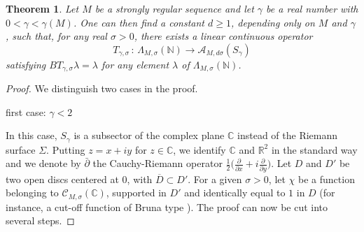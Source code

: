 \documentclass[a4paper]{amsart}
\theoremstyle{plain}
\newtheorem{thm}[subsubsection]{Theorem}
\theoremstyle{definition}
\theoremstyle{remark}
\begin{document}
\begin{thm}\label{mythm}
Let $ M $ be a strongly regular sequence and let $ \gamma $ be a real number with
$ 0<\gamma<\gamma(M) $. One can then find a constant
$ d\geq 1 $, depending only on $ M $ and $ \gamma $,
such that, for any real $ \sigma>0 $, there exists a linear continuous operator
\begin{equation*}
T_{\gamma,\sigma}\, :\, \Lambda_{M,\sigma}(\mathbb{N})\longrightarrow \mathcal{A}_{M,d\sigma}(S_\gamma)
\end{equation*}
satisfying $ BT_{\gamma,\sigma}\lambda=\lambda $ for any element $ \lambda $ of
$ \Lambda_{M,\sigma}(\mathbb{N}) $.
\end{thm}
\begin{proof} We distinguish two cases in the proof.
\begin{center}
\textsf{first case}: $ \gamma<2 $
\end{center}
In this case, $ S_\gamma $ is a subsector of the complex plane $ \mathbb{C} $ instead of the Riemann surface $ \Sigma $. Putting $ z=x+iy $ for $ z\in\mathbb{C} $, we identify $ \mathbb{C} $ and $ \mathbb{R}^2 $ in the standard way and we denote by
$ \bar\partial $ the Cauchy-Riemann operator
$ \frac{1}{2}\big(\frac{\partial}{\partial x}+
i\frac{\partial}{\partial y}\big) $. Let
$ D $ and $ D' $ be two open discs centered at $ 0 $, with
$ \overline{D}\subset D' $. For a given $ \sigma>0 $, let $ \chi $ 
be a function belonging to $ \mathcal{C}_{M,\sigma}(\mathbb{C}) $, supported in $ D' $ and identically equal to $ 1 $ in $ D $ (for instance, a cut-off function of Bruna type \cite{BBMT}\cite{Bruna}\cite{CC2}). The proof can now be cut into several steps.


\end{proof}
\end{document}
